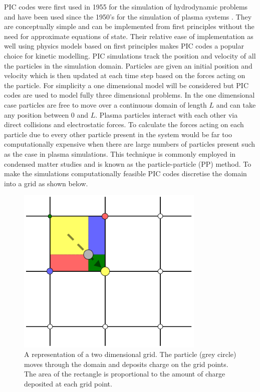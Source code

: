 PIC codes were first used in 1955 for the simulation of hydrodynamic problems and have been used since the 1950's for the simulation of plasma systems \cite{Harlow}. They are conceptually simple and can be implemented from first principles without the need for approximate equations of state. Their relative ease of implementation as well using physics models based on first principles makes PIC codes a popular choice for kinetic modelling. PIC simulations track the position and velocity of all the particles in the simulation domain. Particles are given an initial position and velocity which is then updated at each time step based on the forces acting on the particle. For simplicity a one dimensional model will be considered but PIC codes are used to model fully three dimensional problems. In the one dimensional case particles are free to move over a continuous domain of length $L$ and can take any position between 0 and $L$. Plasma particles interact with each other via direct collisions and electrostatic forces. To calculate the forces acting on each particle due to every other particle present in the system would be far too computationally expensive when there are large numbers of particles present such as the case in plasma simulations. This technique is commonly employed in condensed matter studies and is known as the particle-particle (PP) method. To make the simulations computationally  feasible PIC codes discretise the domain into a grid as shown below.
\begin{figure}[H]
\centering
\includegraphics[width=0.8\textwidth]{grid}
\caption{A representation of a two dimensional grid. The particle (grey circle) moves through the domain and deposits charge on the grid points. The area of the rectangle is proportional to the amount of charge deposited at each grid point.\cite{grid}}
\label{fig:Leapfrog}
\end{figure}

